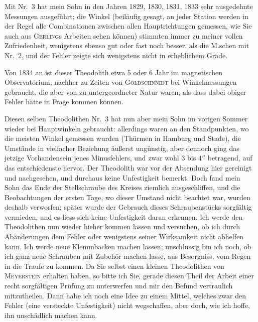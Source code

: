 \documentclass[12pt,a4paper]{article}
\theoremstyle{plain}
\theoremstyle{definition}
\theoremstyle{remark}
\begin{document}
Mit Nr.~3 hat mein Sohn in den Jahren 1829, 1830, 1831, 1833 sehr ausgedehnte Messungen ausgef\"uhrt; die Winkel (beil\"aufig gesagt, an jeder Station werden in der Regel alle Combinationen zwischen allen Hauptrichtungen gemessen, wie Sie auch aus \textsc{Gerling}s Arbeiten sehen k\"onnen) stimmten immer zu meiner vollen Zufriedenheit, wenigstens ebenso gut oder fast noch besser, als die \textsc{M.}schen mit Nr.~2, und der Fehler zeigte sich wenigstens nicht in erheblichem Grade.

Von 1834 an ist dieser Theodolith etwa 5 oder 6 Jahr im magnetischen Observatorium, nachher zu Zeiten von \textsc{Goldschnnidt} bei Winkelmessungen gebraucht, die aber von zu untergeordneter Natur waren, als dass dabei obiger Fehler h\"atte in Frage kommen k\"onnen.

Diesen selben Theodolithen Nr.~3 hat nun aber mein Sohn im vorigen Sommer wieder bei Hauptwinkeln gebraucht: allerdings waren an den Standpunkten, wo die meisten Winkel gemessen wurden (Th\"urmen in Hamburg und Stade), die Umst\"ande in vielfacher Beziehung \"au\ss erst ung\"unstig, aber dennoch ging das jetzige Vorhandensein jenes Minusfehlers, und zwar wohl 3 bis $4''$ betragend, auf das entschiedenste hervor. Der Theodolith war vor der Absendung hier gereinigt und nachgesehen, und durchaus keine Unfestigkeit bemerkt. Doch fand mein Sohn das Ende der Stellschraube des Kreises ziemlich ausgeschliffen, und die Beobachtungen der ersten Tage, wo dieser Umstand nicht beachtet war, wurden deshalb verworfen; sp\"ater wurde der Gebrauch dieses Schraubenst\"ucks sorgf\"altig vermieden, und es liess sich keine Unfestigkeit daran erkennen. Ich werde den Theodolithen nun wieder hieher kommen lassen und versuchen, ob ich durch Ab\"anderungen dem Fehler oder wenigstens seiner Wirksamkeit nicht abhelfen kann. Ich werde neue Klemmbacken machen lassen; unschl\"ussig bin ich noch, ob ich ganz neue Schrauben mit Zubeh\"or machen lasse, aus Besorgniss, vom Regen in die Traufe zu kommen. Da Sie selbst einen kleinen Theodolithen von \textsc{Meyerstein} erhalten haben, so bitte ich Sie, gerade diesen Theil der Arbeit einer recht sorgf\"altigen Pr\"ufung zu unterwerfen und mir den Befund vertraulich mitzutheilen. Dann habe ich noch eine Idee zu einem Mittel, welches zwar den Fehler (eine versteckte Unfestigkeit) nicht wegschaffen, aber doch, wie ich hoffe, ihn unsch\"adlich machen kann.
\end{document}
